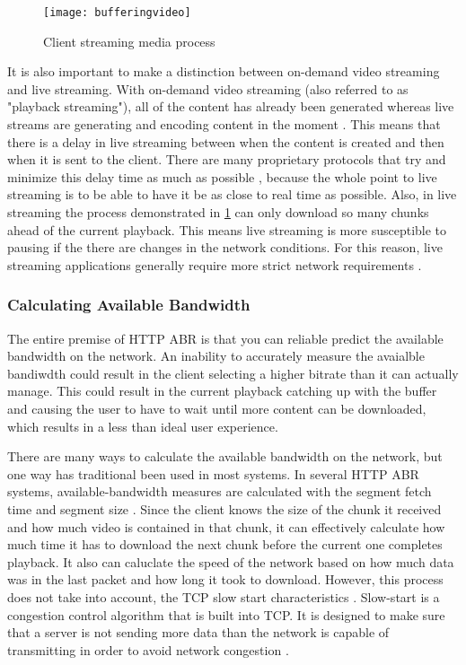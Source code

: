 \documentclass[12pt]{article}
\begin{document}
\begin{figure}[h]
  \begin{center}
    \texttt{[image: bufferingvideo]}
    \caption{Client streaming media process}
    \label{fig:bufferingvideo}
  \end{center}
\end{figure}

It is also important to make a distinction between on-demand video streaming and live streaming.  With on-demand video streaming (also referred to as "playback streaming"), all of the content has already been generated whereas live streams are generating and encoding content in the moment \cite{Kazantzidis02adaptivemultimedia}.  This means that there is a delay in live streaming between when the content is created and then when it is sent to the client.  There are many proprietary protocols that try and minimize this delay time as much as possible \cite{Tanwir201674}, because the whole point to live streaming is to be able to have it be as close to real time as possible.  Also, in live streaming the process demonstrated in \ref{fig:bufferingvideo} can only download so many chunks ahead of the current playback.  This means live streaming is more susceptible to pausing if the there are changes in the network conditions.  For this reason, live streaming applications generally require more strict network requirements \cite{Kazantzidis02adaptivemultimedia}.

\subsubsection{Calculating Available Bandwidth}
The entire premise of HTTP ABR is that you can reliable predict the available bandwidth on the network.  An inability to accurately measure the avaialble bandiwdth could result in the client selecting a higher bitrate than it can actually manage.  This could result in the current playback catching up with the buffer and causing the user to have to wait until more content can be downloaded, which results in a less than ideal user experience.

There are many ways to calculate the available bandwidth on the network, but one way has traditional been used in most systems. In several HTTP ABR systems, available-bandwidth measures are calculated with the segment fetch time and segment size \cite{7057917}.  Since the client knows the size of the chunk it received and how much video is contained in that chunk, it can effectively calculate how much time it has to download the next chunk before the current one completes playback.  It also can caluclate the speed of the network based on how much data was in the last packet and how long it took to download.  However, this process does not take into account, the TCP slow start characteristics \cite{7057917}.  Slow-start is a congestion control algorithm that is built into TCP.  It is designed to make sure that a server is not sending more data than the network is capable of transmitting in order to avoid network congestion \cite{rfc5681}.
\end{document}
